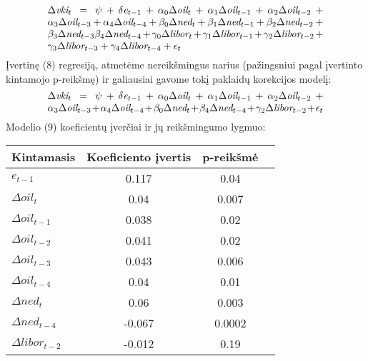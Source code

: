 \documentclass[a4paper]{article}
\begin{document}
\begin{equation}
\begin{minipage}[b]{0.8\linewidth}
$\Delta\textit{vki}_t = \psi + \delta\textit{e}_{t-1} + \alpha_0\Delta\textit{oil}_t + \alpha_1\Delta\textit{oil}_{t-1} + \alpha_2\Delta\textit{oil}_{t-2} + \alpha_3\Delta\textit{oil}_{t-3} + \alpha_4\Delta\textit{oil}_{t-4} + \beta_0\Delta\textit{ned}_{t} +\beta_1\Delta\textit{ned}_{t-1}+\beta_2\Delta\textit{ned}_{t-2}+\beta_3\Delta\textit{ned}_{t-3} \beta_4\Delta\textit{ned}_{t-4} + \gamma_0\Delta\textit{libor}_{t}+ \gamma_1\Delta\textit{libor}_{t-1}+ \gamma_2\Delta\textit{libor}_{t-2}+ \gamma_3\Delta\textit{libor}_{t-3}+ \gamma_4\Delta\textit{libor}_{t-4} + \epsilon_t$
\end{minipage}
\end{equation}\indent
Įvertinę (8) regresiją, atmetėme nereikšmingus narius (pažingsniui pagal įvertinto kintamojo p-reikšmę) ir galiausiai gavome tokį paklaidų korekcijos modelį:
\begin{equation}
\begin{minipage}[b]{0.8\linewidth}

$\Delta\textit{vki}_t = \psi + \delta\textit{e}_{t-1} + \alpha_0\Delta\textit{oil}_t + \alpha_1\Delta\textit{oil}_{t-1} + \alpha_2\Delta\textit{oil}_{t-2} + \alpha_3\Delta\textit{oil}_{t-3} + \alpha_4\Delta\textit{oil}_{t-4} + \beta_0\Delta\textit{ned}_{t} + \beta_4\Delta\textit{ned}_{t-4} + \gamma_2\Delta\textit{libor}_{t-2} + \epsilon_t$
\end{minipage}
\end{equation}\indent
Modelio (9) koeficientų įverčiai ir jų reikšmingumo lygmuo:\\
\begin{table}[!h]
\begin{center}
\begin{tabular}{l|ccc} 
\hline
Kintamasis & Koeficiento įvertis & p-reikšmė\\
\hline
$\textit{e}_{t-1}$&0.117&0.04\\
$\Delta\textit{oil}_{t}$&0.04&0.007\\
$\Delta\textit{oil}_{t-1}$&0.038&0.02\\
$\Delta\textit{oil}_{t-2}$&0.041&0.02\\
$\Delta\textit{oil}_{t-3}$&0.043&0.006\\
$\Delta\textit{oil}_{t-4}$&0.04&0.01\\
$\Delta\textit{ned}_{t}$&0.06&0.003\\
$\Delta\textit{ned}_{t-4}$&-0.067&0.0002\\
$\Delta\textit{libor}_{t-2}$&-0.012&0.19\\
\hline
\end{tabular} 
\end{center}
\end{table}\\\indent
\end{document}
